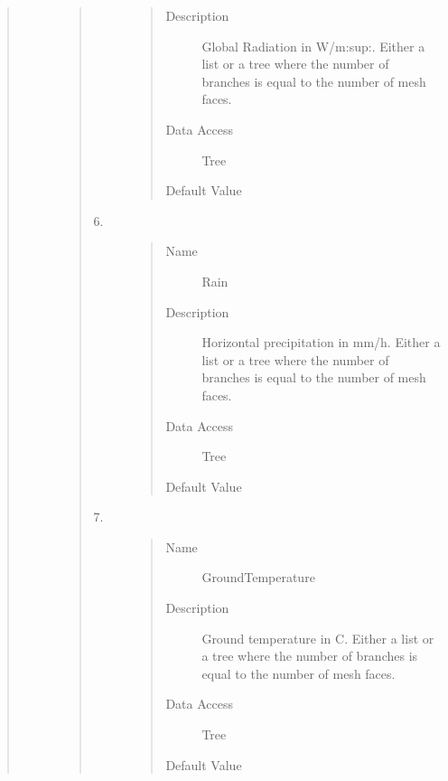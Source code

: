 \documentclass[letterpaper,10pt,english]{sphinxmanual}
\begin{document}
\begin{quote}
\begin{description}
\begin{quote}
\begin{description}
\begin{quote}
\begin{description}
\item[{Description}] \leavevmode
Global Radiation in W/m:sup:. Either a list or a tree where the number of branches is equal to the number
of mesh faces.

\item[{Data Access}] \leavevmode
Tree

\item[{Default Value}] \leavevmode
{}

\end{description}\end{quote}

\item[{6.}] \leavevmode\begin{quote}\begin{description}
\item[{Name}] \leavevmode
Rain

\item[{Description}] \leavevmode
Horizontal precipitation in mm/h. Either a list or a tree where the number of branches is equal to the number
of mesh faces.

\item[{Data Access}] \leavevmode
Tree

\item[{Default Value}] \leavevmode
{}

\end{description}\end{quote}

\item[{7.}] \leavevmode\begin{quote}\begin{description}
\item[{Name}] \leavevmode
GroundTemperature

\item[{Description}] \leavevmode
Ground temperature in C. Either a list or a tree where the number of branches is equal to the number
of mesh faces.

\item[{Data Access}] \leavevmode
Tree

\item[{Default Value}] \leavevmode
{}


\end{description}
\end{quote}
\end{description}
\end{quote}
\end{description}
\end{quote}
\end{document}
